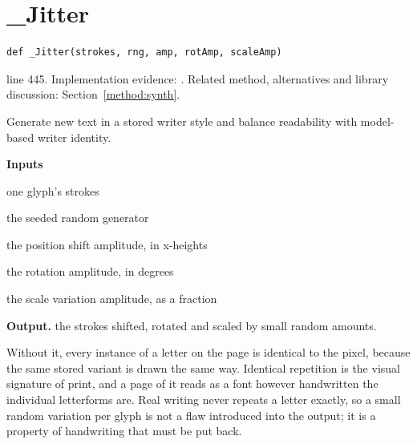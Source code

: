 \section{\_Jitter}\label{fn:synthesise:-Jitter}
\begin{lstlisting}[style=sig]
def _Jitter(strokes, rng, amp, rotAmp, scaleAmp)
\end{lstlisting}
 line 445. Implementation evidence: \cite{code2026}. Related method, alternatives and library discussion: Section~\ref{method:synth}.


Generate new text in a stored writer style and balance readability with model-based writer identity.




\noindent\textbf{Inputs}
\begin{description}[leftmargin=2.2em,style=nextline,font=\normalfont\ttfamily]\setlength\itemsep{1pt}
  \item[{strokes}] \normalfont one glyph's strokes
  \item[{rng}] \normalfont the seeded random generator
  \item[{amp}] \normalfont the position shift amplitude, in x-heights
  \item[{rotAmp}] \normalfont the rotation amplitude, in degrees
  \item[{scaleAmp}] \normalfont the scale variation amplitude, as a fraction
\end{description}

\noindent\textbf{Output.} the strokes shifted, rotated and scaled by small random amounts.


Without it, every instance of a letter on the page is identical to the pixel, because the same stored variant is drawn the same way. Identical repetition is the visual signature of print, and a page of it reads as a font however handwritten the individual letterforms are. Real writing never repeats a letter exactly, so a small random variation per glyph is not a flaw introduced into the output; it is a property of handwriting that must be put back.



